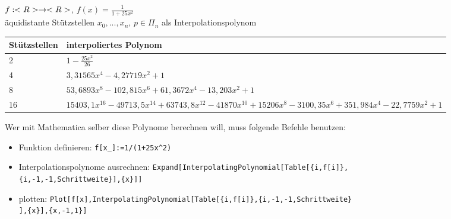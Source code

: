 \begin{example}
	$f:<R>\to<R>$, $f(x)=\frac{1}{1+25x^2}$ \\
	äquidistante Stützstellen $x_0,...,x_n$, $p\in\Pi_n$ als Interpolationspolynom
	\begin{center}
		\begin{tabular}{l|p{8cm}}
			\textbf{Stützstellen} & \textbf{interpoliertes Polynom} \\
			\hline
			2 & $1-\frac{25x^2}{26}$ \\
			\hline
			4 & $3,31565x^4 - 4,27719x^2 + 1$ \\
			\hline
			8 & $53,6893x^8 - 102,815x^6 + 61,3672x^4 - 13,203x^2 + 1$ \\
			\hline
			16 & $15403,1x^{16} - 49713,5x^{14} + 63743,8x^{12} - 41870x^{10} + 15206x^8 - 3100,35x^6 + 351,984x^4 - 22,7759x^2 + 1$
		\end{tabular}
	\end{center}
	\begin{center}\end{center}
\end{example}

\begin{*anmerkung}
	Wer mit Mathematica selber diese Polynome berechnen will, muss folgende Befehle benutzen:
	\begin{itemize}
	\item Funktion definieren: \verb|f[x_]:=1/(1+25x^2)|
	\item Interpolationspolynome ausrechnen: \texttt{Expand[InterpolatingPolynomial[Table[\{i,f[i]\},} \\
	\texttt{\{i,-1,-1,Schrittweite\}],\{x\}]]}
	\item plotten: \texttt{Plot[{f[x],InterpolatingPolynomial[Table[\{i,f[i]\},\{i,-1,-1,Schrittweite\}} \\
	\texttt{],\{x\}]},\{x,-1,1\}]}
	\end{itemize}
\end{*anmerkung}